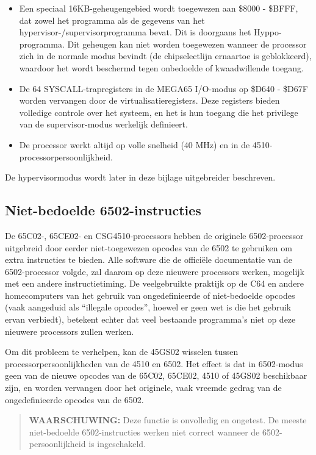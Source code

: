 \begin{itemize}
\item Een speciaal 16KB-geheugengebied wordt toegewezen aan \$8000 - \$BFFF, dat zowel het programma als de gegevens van het hypervisor-/supervisorprogramma bevat. Dit is doorgaans het Hyppo-programma. Dit geheugen kan niet worden toegewezen wanneer de processor zich in de normale modus bevindt (de chipselectlijn ernaartoe is geblokkeerd), waardoor het wordt beschermd tegen onbedoelde of kwaadwillende toegang.\item De 64 SYSCALL-trapregisters in de MEGA65 I/O-modus op \$D640 - \$D67F worden vervangen door de virtualisatieregisters. Deze registers bieden volledige controle over het systeem, en het is hun toegang die het privilege van de supervisor-modus werkelijk definieert. \item De processor werkt altijd op volle snelheid (40 MHz) en in de 4510-processorpersoonlijkheid.
\end{itemize}

De hypervisormodus wordt later in deze bijlage uitgebreider beschreven.

\subsection{Niet-bedoelde 6502-instructies}

De 65C02-, 65CE02- en CSG4510-processors hebben de originele 6502-processor uitgebreid door eerder niet-toegewezen opcodes van de 6502 te gebruiken om extra instructies te bieden. Alle software die de officiële documentatie van de 6502-processor volgde, zal daarom op deze nieuwere processors werken, mogelijk met een andere instructietiming. De veelgebruikte praktijk op de C64 en andere homecomputers van het gebruik van ongedefinieerde of niet-bedoelde opcodes (vaak aangeduid als ``illegale opcodes'', hoewel er geen wet is die het gebruik ervan verbiedt), betekent echter dat veel bestaande programma's niet op deze nieuwere processors zullen werken.

Om dit probleem te verhelpen, kan de 45GS02 wisselen tussen processorpersoonlijkheden van de 4510 en 6502. Het effect is dat in 6502-modus geen van de nieuwe opcodes van de 65C02, 65CE02, 4510 of 45GS02 beschikbaar zijn, en worden vervangen door het originele, vaak vreemde gedrag van de ongedefinieerde opcodes van de 6502.

\begin{quote}
{\bf WAARSCHUWING:} Deze functie is onvolledig en ongetest. De meeste niet-bedoelde 6502-instructies werken niet correct wanneer de 6502-persoonlijkheid is ingeschakeld.
\end{quote}

